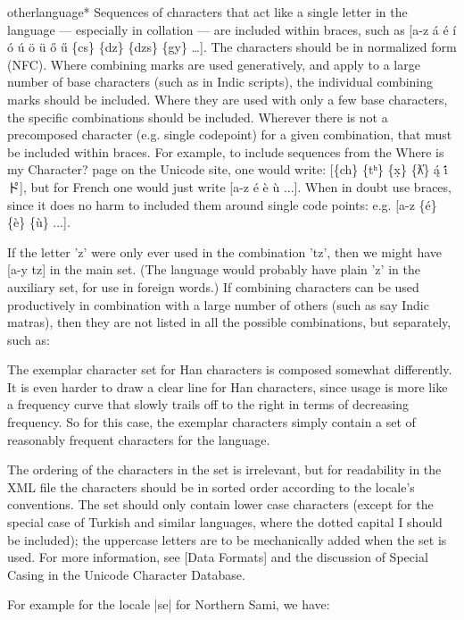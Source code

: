 \begin{docCommandd}{otherlanguage*} { }
Sequences of characters that act like a single letter in the language — especially in collation — are included within braces, such as [a-z á é í ó ú ö ü ő ű \{cs\} \{dz\} \{dzs\} \{gy\} \ldots]. The characters should be in normalized form (NFC). Where combining marks are used generatively, and apply to a large number of base characters (such as in Indic scripts), the individual combining marks should be included. Where they are used with only a few base characters, the specific combinations should be included. Wherever there is not a precomposed character (e.g. single codepoint) for a given combination, that must be included within braces. For example, to include sequences from the Where is my Character? page on the Unicode site, one would write: [\{ch\} \{tʰ\} \{x̣\} \{ƛ̓\} {ą́} {i̇́} {ト゚}], but for French one would just write [a-z é è ù ...]. When in doubt use braces, since it does no harm to included them around single code points: e.g. [a-z \{é\} \{è\} \{ù\} ...].

If the letter 'z' were only ever used in the combination 'tz', then we might have [a-y {tz}] in the main set. (The language would probably have plain 'z' in the auxiliary set, for use in foreign words.) If combining characters can be used productively in combination with a large number of others (such as say Indic matras), then they are not listed in all the possible combinations, but separately, such as:

{\panunicode [‌ ‍ ॐ ०-९ ऄ-ऋ ॠ ऌ ॡ ऍ-क क़ ख ख़ ग ग़ घ-ज ज़ झ-ड ड़ ढ ढ़ ण-फ फ़ ब-य य़ र-ह ़ ँ-ः ॑-॔ ऽ ् ॽ ा-ॄ ॢ ॣ ॅ-ौ] }

The exemplar character set for Han characters is composed somewhat differently. It is even harder to draw a clear line for Han characters, since usage is more like a frequency curve that slowly trails off to the right in terms of decreasing frequency. So for this case, the exemplar characters simply contain a set of reasonably frequent characters for the language.

The ordering of the characters in the set is irrelevant, but for readability in the XML file the characters should be in sorted order according to the locale's conventions. The set should only contain lower case characters (except for the special case of Turkish and similar languages, where the dotted capital I should be included); the uppercase letters are to be mechanically added when the set is used. For more information, see [Data Formats] and the discussion of Special Casing in the Unicode Character Database.

For example for the locale |se| for Northern Sami, we have:



\end{docCommandd}
